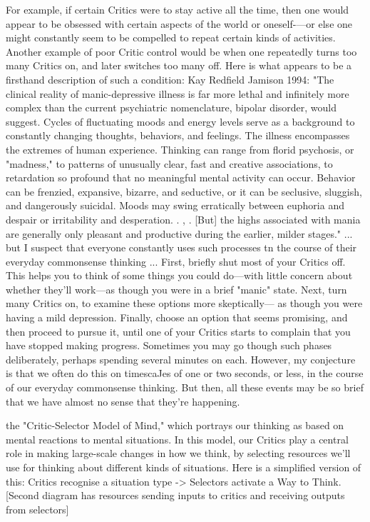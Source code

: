 \documentclass[10pt,a4paper]{article}
\begin{document}
For example, if certain Critics were to stay active all the time, then one would appear to be obsessed with certain aspects of the world or oneself-—or else one might constantly seem to be compelled to repeat certain kinds of activities. Another example of poor Critic control would be when one repeatedly turns too many Critics on, and later switches too many off. Here is what appears to be a firsthand description of such a condition:
Kay Redfield Jamison 1994: "The clinical reality of manic-depressive illness is far more lethal and infinitely more complex than the current psychiatric nomenclature, bipolar disorder, would suggest. Cycles of fluctuating moods and energy levels serve as a background to constantly changing thoughts, behaviors, and feelings. The illness encompasses the extremes of human experience. Thinking can range from florid psychosis, or "madness," to patterns of unusually clear, fast and creative associations, to retardation so profound that no meaningful mental activity can occur. Behavior can be frenzied, expansive, bizarre, and seductive, or it can be seclusive, sluggish, and dangerously suicidal. Moods may swing erratically between euphoria and despair or irritability and desperation. . , . [But] the highs associated with mania are generally only pleasant and productive during the earlier, milder stages."
...
but I suspect that everyone constantly uses such processes tn
the course of their everyday commonsense thinking
...
First, briefly shut most of your Critics off. This helps you to think of some things you could do—with little concern about whether they'll work—as though you were in a brief "manic" state.
Next, turn many Critics on, to examine these options more skeptically— as though you were having a mild depression.
Finally, choose an option that seems promising, and then proceed to pursue it, until one of your Critics starts to complain that you have stopped making progress.
Sometimes you may go though such phases deliberately, perhaps spending several minutes on each. However, my conjecture is that we often do this on timescaJes of one or two seconds, or less, in the course of our everyday commonsense thinking. But then, all these events may be so brief that we have almost no sense that they're happening.\cite[p.~83-85]{minsky}

the "Critic-Selector Model of Mind," which portrays our thinking as based on mental reactions to mental situations. In this model, our Critics play a central role in making large-scale changes in how we think, by selecting resources we'll use for thinking about different kinds of situations. Here is a simplified version of this:
Critics recognise a situation type -> Selectors activate a Way to Think. [Second diagram has resources sending inputs to critics and receiving outputs from selectors]\cite[p.~85-86]{minsky}
\end{document}
